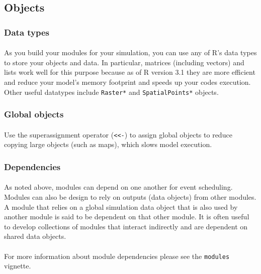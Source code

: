 \documentclass{article}
\begin{document}
\subsection{Objects}

\subsubsection{Data types}

\paragraph{}
As you build your modules for your simulation, you can use any of \textsf{R}'s data types to store your objects and data. In particular, matrices (including vectors) and lists work well for this purpose because as of \textsf{R} version 3.1 they are more efficient and reduce your model's memory footprint and speeds up your codes execution. Other useful datatypes include \texttt{Raster*} and \texttt{SpatialPoints*} objects.

\subsubsection{Global objects}

\paragraph{}
Use the superassignment operator (\texttt{<}\texttt{<-}) to assign global objects to reduce copying large objects (such as maps), which slows model execution.

\subsubsection{Dependencies}

\paragraph{}
As noted above, modules can depend on one another for event scheduling. Modules can also be design to rely on outputs (data objects) from other modules. A module that relies on a global simulation data object that is also used by another module is said to be dependent on that other module. It is often useful to develop collections of modules that interact indirectly and are dependent on shared data objects.

\paragraph{}
For more information about module dependencies please see the \texttt{modules} vignette.
\end{document}
